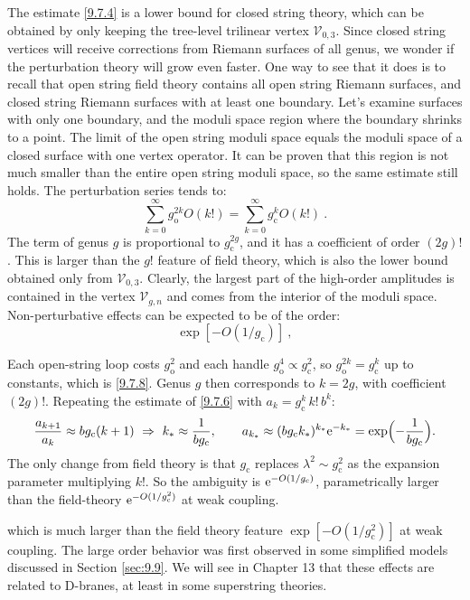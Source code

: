 The estimate \eqref{9.7.4} is a lower bound for closed string theory, which can be obtained by only keeping the tree-level trilinear vertex $\mathscr{V}_{0,3}$. 
Since closed string vertices will receive corrections from Riemann surfaces of all genus, we wonder if the perturbation theory will grow even faster. One way to see that it does is to recall that open string field theory contains all open string Riemann surfaces, 
and closed string Riemann surfaces with at least one boundary. Let's examine surfaces with only one boundary, and the moduli space region where the boundary shrinks to a point. 
The limit of the open string moduli space equals the moduli space of a closed surface with one vertex operator. It can be proven that this region is not much smaller than the entire open string moduli space, so the same estimate still holds.
The perturbation series tends to:
\begin{equation}
	\sum_{k=0}^{\infty} g_{\mathrm{o}}^{2 k} O(k !)=\sum_{k=0}^{\infty} g_{\mathrm{c}}^{k} O(k !) \:. \label{9.7.8}
\end{equation}
The term of genus $g$ is proportional to $g_{\mathrm{c}}^{2 g}$, and it has a coefficient of order $(2g)!$.
This is larger than the $g!$ feature of field theory, 
which is also the lower bound obtained only from $\mathscr{V}_{0,3}$. Clearly, the largest part of the high-order amplitudes is contained in the vertex $\mathscr{V}_{g, n}$ and comes from the interior of the moduli space. 
Non-perturbative effects can be expected to be of the order:
\begin{equation}
	\exp [-O(1/g_{\mathrm{c}})] \:, \label{9.7.9}
\end{equation}
\begin{tcolorbox}[breakable]
	\begin{remark}
		Each open-string loop costs $g_{\mathrm o}^2$ and each handle $g_{\mathrm o}^4\propto g_{\mathrm c}^2$, so $g_{\mathrm o}^{2k}=g_{\mathrm c}^{k}$ up to constants, which is \eqref{9.7.8}. Genus $g$ then corresponds to $k=2g$, with coefficient $(2g)!$. Repeating the estimate of \eqref{9.7.6} with $a_k=g_{\mathrm c}^k\,k!\,b^k$:
		\begin{equation*}
			\frac{a_{k+1}}{a_k}\approx bg_{\mathrm c}(k+1)\ \Rightarrow\ k_*\approx\frac{1}{bg_{\mathrm c}},\qquad a_{k_*}\approx(bg_{\mathrm c}k_*)^{k_*}\mathrm{e}^{-k_*}=\exp\Bigl(-\frac{1}{bg_{\mathrm c}}\Bigr).
		\end{equation*}
		The only change from field theory is that $g_{\mathrm c}$ replaces $\lambda^2\sim g_{\mathrm c}^2$ as the expansion parameter multiplying $k!$. So the ambiguity is $\mathrm{e}^{-O(1/g_{\mathrm c})}$, parametrically larger than the field-theory $\mathrm{e}^{-O(1/g_{\mathrm c}^2)}$ at weak coupling.
	\end{remark}
\end{tcolorbox}
which is much larger than the field theory feature $\exp[-O(1 / g_{\mathrm{c}}^{2})]$ at weak coupling. The large order behavior was first observed in some simplified models discussed in Section \ref{sec:9.9}.
We will see in Chapter 13 that these effects are related to D-branes, at least in some superstring theories.


